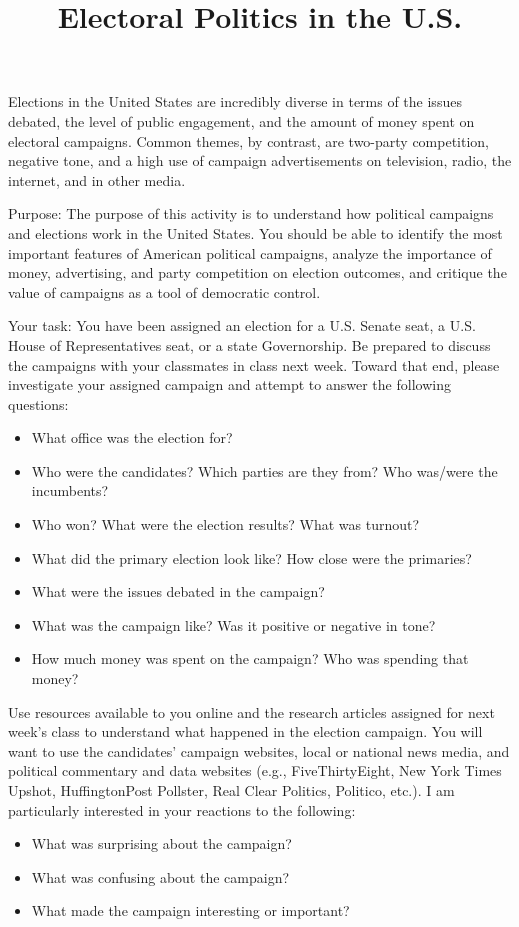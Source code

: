 \documentclass[a4, 12pt]{article}
\title{Electoral Politics in the U.S.\vspace{-2em}}
\author{}
\date{}
\begin{document}
\maketitle

\onehalfspacing

\noindent Elections in the United States are incredibly diverse in terms of the issues debated, the level of public engagement, and the amount of money spent on electoral campaigns. Common themes, by contrast, are two-party competition, negative tone, and a high use of campaign advertisements on television, radio, the internet, and in other media.

\vspace{1em}
\noindent Purpose: The purpose of this activity is to understand how political campaigns and elections work in the United States. You should be able to identify the most important features of American political campaigns, analyze the importance of money, advertising, and party competition on election outcomes, and critique the value of campaigns as a tool of democratic control.

\vspace{1em}
\noindent Your task: You have been assigned an election for a U.S. Senate seat, a U.S. House of Representatives seat, or a state Governorship. Be prepared to discuss the campaigns with your classmates in class next week. Toward that end, please investigate your assigned campaign and attempt to answer the following questions:

\begin{itemize}
	\item What office was the election for?
	\item Who were the candidates? Which parties are they from? Who was/were the incumbents?
	\item Who won? What were the election results? What was turnout?
	\item What did the primary election look like? How close were the primaries?
	\item What were the issues debated in the campaign?
	\item What was the campaign like? Was it positive or negative in tone?
	\item How much money was spent on the campaign? Who was spending that money?
\end{itemize}

\noindent Use resources available to you online and the research articles assigned for next week's class to understand what happened in the election campaign. You will want to use the candidates' campaign websites, local or national news media, and political commentary and data websites (e.g., FiveThirtyEight, New York Times Upshot, HuffingtonPost Pollster, Real Clear Politics, Politico, etc.). I am particularly interested in your reactions to the following:

\begin{itemize}
	\item What was surprising about the campaign?
	\item What was confusing about the campaign?
	\item What made the campaign interesting or important?
\end{itemize}
\end{document}
